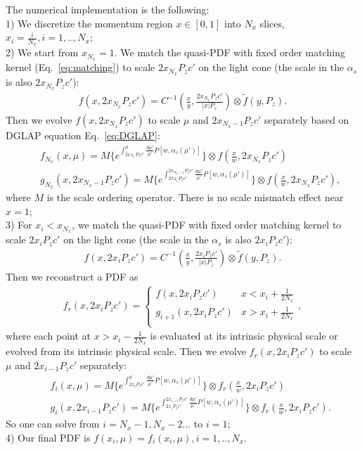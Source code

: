 \documentclass[prd,aps,twocolumn,preprintnumbers, showpacs, nofootinbib,superscriptaddress,notitlepage]{revtex4-2}
\def\bea{\begin{eqnarray}}
\def\eea{\end{eqnarray}}
\begin{document}
The numerical implementation is the following:\\ 
1) We discretize the momentum region $x \in [0,1]$ into $N_x$ slices, $x_{i}=\frac{i}{N_x}, i=1,..,N_x$;\\
2) We start from $x_{N_x}=1$. We match the quasi-PDF with fixed order matching kernel (Eq.~\eqref{eq:matching}) to scale $2 x_{N_x} P_z c'$ on the light cone (the scale in the $\alpha_s$ is also $2 x_{N_x} P_z c'$):
\bea
f(x,2 x_{N_x} P_z c') = C^{-1}\left(\frac{x}{y}, \frac{2 x_{N_x} P_z c'}{|x| P_{z}}\right) \otimes \tilde{f}(y,P_z).
\eea
Then we evolve $f(x,2 x_{N_x} P_z c')$ to scale $\mu$ and $2 x_{N_x-1} P_z c'$ separately based on DGLAP equation Eq.~\eqref{eq:DGLAP}:
\bea
&&f_{N_x}(x,\mu) = M\Big\{e^{\int_{2 x_{N_x} P_z c'}^{\mu} 
\frac{d\mu'}{\mu'} P[w,\alpha_{s}(\mu')]}\Big\} \otimes f\left(\frac{x}{w},2 x_{N_x} P_z c'\right) \nonumber\\
&&g_{N_x}(x,2 x_{N_x-1} P_z c')= M\Big\{e^{\int_{2 x_{N_x} P_z c'}^{2 x_{N_x-1} P_z c'} 
\frac{d\mu'}{\mu'} P[w,\alpha_{s}(\mu')]}\Big\} \otimes f\left(\frac{x}{w},2 x_{N_x} P_z c'\right), 
\eea
where $M$ is the scale ordering operator. There is no scale mismatch effect near $x=1$;\\
3) For $x_i<x_{N_x}$, we match the quasi-PDF with fixed order matching kernel to scale $2 x_{i} P_z c'$ on the light cone (the scale in the $\alpha_s$ is also $2 x_{i} P_z c'$): 
\bea
f(x,2 x_{i} P_z c') = C^{-1}\left(\frac{x}{y}, \frac{2 x_{i} P_z c'}{|x| P_{z}}\right) \otimes \tilde{f}(y,P_z). 
\eea
Then we reconstruct a PDF as
\bea
f_r(x,2 x_{i} P_z c') = 
\begin{cases}
f(x,2 x_{i} P_z c') & x < x_{i}+\frac{1}{2N_x} \\
g_{i+1}(x,2 x_{i} P_z c') & x > x_{i}+\frac{1}{2N_x} \\
\end{cases},
\eea
where each point at $x>x_{i}-\frac{1}{2N_x}$ is evaluated at its intrinsic physical scale or evolved from its intrinsic physical scale.
Then we evolve $f_r(x,2 x_{i} P_z c')$ to scale $\mu$ and $2 x_{i-1} P_z c'$ separately:
\bea
&&f_{i}(x,\mu) = M\Big\{e^{\int_{2 x_{i} P_z c'}^{\mu} 
\frac{d\mu'}{\mu'} P[w,\alpha_{s}(\mu')]}\Big\} \otimes f_r\left(\frac{x}{w},2 x_{i} P_z c'\right) \nonumber\\
&&g_{i}(x,2 x_{i-1} P_z c')= M\Big\{e^{\int_{2 x_{i} P_z c'}^{2 x_{i-1} P_z c'} 
\frac{d\mu'}{\mu'} P[w,\alpha_{s}(\mu')]}\Big\} \otimes f_r\left(\frac{x}{w},2 x_{i} P_z c'\right). 
\eea
So one can solve from $i=N_x-1,N_x-2...$ to $i=1$;\\
4) Our final PDF is $f(x_i,\mu)=f_{i}(x_i,\mu), i=1,..,N_x$.
\end{document}
